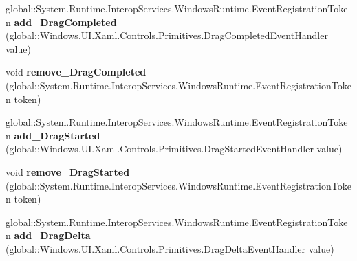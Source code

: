 \begin{DoxyCompactItemize}
\item 
\mbox{\label{interface_windows_1_1_u_i_1_1_xaml_1_1_controls_1_1_primitives_1_1_i_thumb_ad9d99e0f3518ed7231b6226b63c2d3e9}} 
global\+::\+System.\+Runtime.\+Interop\+Services.\+Windows\+Runtime.\+Event\+Registration\+Token {\bfseries add\+\_\+\+Drag\+Completed} (global\+::\+Windows.\+U\+I.\+Xaml.\+Controls.\+Primitives.\+Drag\+Completed\+Event\+Handler value)
\item 
\mbox{\label{interface_windows_1_1_u_i_1_1_xaml_1_1_controls_1_1_primitives_1_1_i_thumb_a9c342427ff81fa677a36391138856518}} 
void {\bfseries remove\+\_\+\+Drag\+Completed} (global\+::\+System.\+Runtime.\+Interop\+Services.\+Windows\+Runtime.\+Event\+Registration\+Token token)
\item 
\mbox{\label{interface_windows_1_1_u_i_1_1_xaml_1_1_controls_1_1_primitives_1_1_i_thumb_af16d7fcdb997b8237d826597ee4dfdf9}} 
global\+::\+System.\+Runtime.\+Interop\+Services.\+Windows\+Runtime.\+Event\+Registration\+Token {\bfseries add\+\_\+\+Drag\+Started} (global\+::\+Windows.\+U\+I.\+Xaml.\+Controls.\+Primitives.\+Drag\+Started\+Event\+Handler value)
\item 
\mbox{\label{interface_windows_1_1_u_i_1_1_xaml_1_1_controls_1_1_primitives_1_1_i_thumb_a160f1c382efe8c910b223fd4ae316948}} 
void {\bfseries remove\+\_\+\+Drag\+Started} (global\+::\+System.\+Runtime.\+Interop\+Services.\+Windows\+Runtime.\+Event\+Registration\+Token token)
\item 
\mbox{\label{interface_windows_1_1_u_i_1_1_xaml_1_1_controls_1_1_primitives_1_1_i_thumb_adb368ed2352b40482e7d4b409ff13165}} 
global\+::\+System.\+Runtime.\+Interop\+Services.\+Windows\+Runtime.\+Event\+Registration\+Token {\bfseries add\+\_\+\+Drag\+Delta} (global\+::\+Windows.\+U\+I.\+Xaml.\+Controls.\+Primitives.\+Drag\+Delta\+Event\+Handler value)
\item 
\mbox{\label{interface_windows_1_1_u_i_1_1_xaml_1_1_controls_1_1_primitives_1_1_i_thumb_a7f2e0d4f77e1da383618536040a32d00}} 

\end{DoxyCompactItemize}
